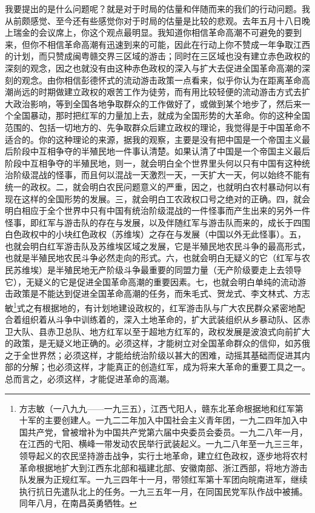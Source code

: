 \documentclass[UTF8, 12pt, a4paper]{ctexrep}
\begin{document}
我要提出的是什么问题呢？就是对于时局的估量和伴随而来的我们的行动问题。我从前颇感觉、至今还有些感觉你对于时局的估量是比较的悲观。去年五月十八日晚上瑞金的会议席上，你这个观点最明显。我知道你相信革命高潮不可避免的要到来，但你不相信革命高潮有迅速到来的可能，因此在行动上你不赞成一年争取江西的计划，而只赞成闽粤赣交界三区域的游击；同时在三区域也没有建立赤色政权的深刻的观念，因之也就没有由这种赤色政权的深入与扩大去促进全国革命高潮的深刻的观念。由你相信彭德怀式的流动游击政策一点看来，似乎你认为在距离革命高潮尚远的时期做建立政权的艰苦工作为徒劳，而有用比较轻便的流动游击方式去扩大政治影响，等到全国各地争取群众的工作做好了，或做到某个地步了，然后来一个全国暴动，那时把红军的力量加上去，就成为全国形势的大革命。你的这种全国范围的、包括一切地方的、先争取群众后建立政权的理论，我觉得是于中国革命不适合的。你的这种理论的来源，据我的观察，主要是没有把中国是一个帝国主义最后阶段中互相争夺的半殖民地一件事认清楚。如果认清了中国是一个帝国主义最后阶段中互相争夺的半殖民地，则一，就会明白全个世界里头何以只有中国有这种统治阶级混战的怪事，而且何以混战一天激烈一天，一天扩大一天，何以始终不能有统一的政权。二，就会明白农民问题意义的严重，因之，也就明白农村暴动何以有现在这样的全国形势的发展。三，就会明白工农政权口号之绝对的正确。四，就会明白相应于全个世界中只有中国有统治阶级混战的一件怪事而产生出来的另外一件怪事，即红军与游击队的存在与发展，以及伴随红军与游击队而来的，成长于四围白色政权中的小块红色政权（苏维埃）之存在与发展（中国以外无此怪事）。五，也就会明白红军游击队及苏维埃区域之发展，它是半殖民地农民斗争的最高形式，也就是半殖民地农民斗争必然走向的形式。六，也就会明白无疑义的它（红军与农民苏维埃）是半殖民地无产阶级斗争最重要的同盟力量（无产阶级要走上去领导它），无疑义的它是促进全国革命高潮的重要因素。七，也就会明白单纯的流动游击政策是不能达到促进全国革命高潮的任务，而朱毛式、贺龙式、李文林式、方志敏\footnote{方志敏（一八九九——一九三五），江西弋阳人，赣东北革命根据地和红军第十军的主要创建人。一九二二年加入中国社会主义青年团，一九二四年加入中国共产党，曾被增补为中国共产党第六届中央委员会委员。一九二八年一月，在江西的弋阳、横峰一带发动农民举行武装起义。一九二八年至一九三三年，领导起义的农民坚持游击战争，实行土地革命，建立红色政权，逐步地将农村革命根据地扩大到江西东北部和福建北部、安徽南部、浙江西部，将地方游击队发展为正规红军。一九三四年十一月，带领红军第十军团向皖南进军，继续执行抗日先遣队北上的任务。一九三五年一月，在同国民党军队作战中被捕。同年八月，在南昌英勇牺牲。}式之有根据地的，有计划地建设政权的，红军游击队与广大农民群众紧密地配合着组织着从斗争中训练着的，深入土地革命的，扩大武装组织从乡暴动队、区赤卫大队、县赤卫总队、地方红军以至于超地方红军的，政权发展是波浪式向前扩大的政策，是无疑义地正确的。必须这样，才能树立对全国革命群众的信仰，如苏俄之于全世界然；必须这样，才能给统治阶级以甚大的困难，动摇其基础而促进其内部的分解；也必须这样，才能真正的创造红军，成为将来大革命的重要工具之一。总而言之，必须这样，才能促进革命的高潮。
\end{document}
